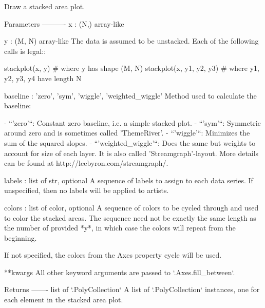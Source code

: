 \begin{DoxyVerb}Draw a stacked area plot.

Parameters
----------
x : (N,) array-like

y : (M, N) array-like
    The data is assumed to be unstacked. Each of the following
    calls is legal::

        stackplot(x, y)           # where y has shape (M, N)
        stackplot(x, y1, y2, y3)  # where y1, y2, y3, y4 have length N

baseline : {'zero', 'sym', 'wiggle', 'weighted_wiggle'}
    Method used to calculate the baseline:

    - ``'zero'``: Constant zero baseline, i.e. a simple stacked plot.
    - ``'sym'``:  Symmetric around zero and is sometimes called
      'ThemeRiver'.
    - ``'wiggle'``: Minimizes the sum of the squared slopes.
    - ``'weighted_wiggle'``: Does the same but weights to account for
      size of each layer. It is also called 'Streamgraph'-layout. More
      details can be found at http://leebyron.com/streamgraph/.

labels : list of str, optional
    A sequence of labels to assign to each data series. If unspecified,
    then no labels will be applied to artists.

colors : list of color, optional
    A sequence of colors to be cycled through and used to color the stacked
    areas. The sequence need not be exactly the same length as the number
    of provided *y*, in which case the colors will repeat from the
    beginning.

    If not specified, the colors from the Axes property cycle will be used.

**kwargs
    All other keyword arguments are passed to `.Axes.fill_between`.

Returns
-------
list of `.PolyCollection`
    A list of `.PolyCollection` instances, one for each element in the
    stacked area plot.
\end{DoxyVerb}
 